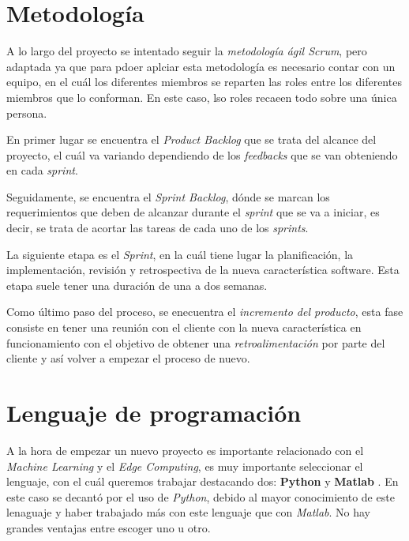 
\section{Metodología}
A lo largo del proyecto se intentado seguir la \textit{metodología ágil Scrum}, pero adaptada ya que para pdoer aplciar esta metodología es necesario contar con un equipo, en el cuál los diferentes miembros se reparten las roles entre los diferentes miembros que lo conforman. En este caso, lso roles recaeen todo sobre una única persona.


En primer lugar se encuentra el \textit{Product Backlog}\cite{scrum} que se trata del alcance del proyecto, el cuál va variando dependiendo de los \textit{feedbacks} que se van obteniendo en cada \textit{sprint}.

Seguidamente, se encuentra el \textit{Sprint Backlog}, dónde se marcan los requerimientos que deben de alcanzar durante el \textit{sprint} que se va a iniciar, es decir, se trata de acortar las tareas de cada uno 
de los \textit{sprints}.

La siguiente etapa es el \textit{Sprint}, en la cuál tiene lugar la planificación, la implementación, revisión y retrospectiva de la nueva característica software.
Esta etapa suele tener una duración de una a dos semanas.

Como último paso del proceso, se enecuentra el \textit{incremento del producto}, esta fase consiste en tener una reunión con el cliente con la nueva característica en funcionamiento con el objetivo de obtener una \textit{retroalimentación} por parte del cliente y así volver a empezar el proceso de nuevo.


\section{Lenguaje de programación}
A la hora de empezar un nuevo proyecto es importante relacionado con el \textit{Machine Learning} y el \textit{Edge Computing}, es muy importante seleccionar el lenguaje, con el cuál queremos trabajar destacando dos: \textbf{Python} \cite{python} y \textbf{Matlab} \cite{matlab}.
En este caso se decantó por el uso de \textit{Python}, debido al mayor conocimiento de este lenaguaje y haber trabajado más con este lenguaje que con \textit{Matlab}.
No hay grandes ventajas entre escoger uno u otro.

